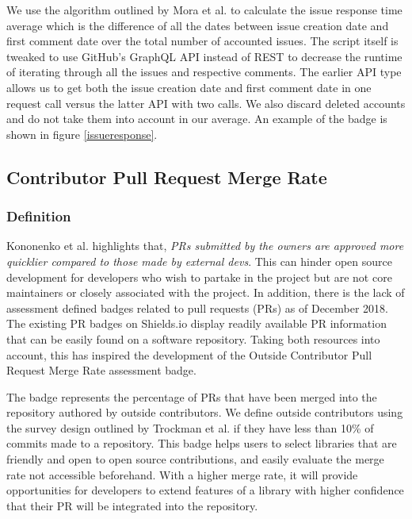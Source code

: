 \documentclass[12pt, letterpaper]{article}
\begin{document}
We use the algorithm outlined by Mora et al. \cite{metrics} to calculate the issue response time average which
is the difference of all the dates between issue creation date and first comment date over the total number of 
accounted issues. 
The script itself is tweaked to use GitHub's \cite{github} GraphQL API instead of REST to decrease the runtime of iterating through
all the issues and respective comments. The earlier API type allows us to get both the issue creation date and first
comment date in one request call versus the latter API with two calls.
We also discard deleted accounts and do not take them into account in our average.
An example of the badge is shown in figure \ref{issueresponse}.


\subsection{Contributor Pull Request Merge Rate}
\subsubsection{Definition}
Kononenko et al. \cite{shopifyarticle} highlights that, \textit{PRs submitted by the owners are approved more
quicklier compared to those made by external devs}. This can hinder open source development
for developers who wish to partake in the project but are not core maintainers or closely associated with the project.
In addition, there is the lack of assessment defined badges \cite{githubbadges} related to pull requests (PRs)
as of December 2018.
The existing PR badges on Shields.io \cite{shields} display readily available PR information that can be easily found on a 
software repository. Taking both resources \cite{shields, shopifyarticle} into account, this has inspired
the development of the Outside Contributor Pull Request Merge Rate assessment badge. 


The badge represents the percentage of PRs that have been merged into the repository authored by outside contributors.
We define outside contributors using the survey design outlined by Trockman et al. \cite{githubbadges} if they have 
less than 10\% of commits made to a repository. 
This badge helps users to select libraries that are friendly and open to open source contributions,
and easily evaluate the merge rate not accessible beforehand.
With a higher merge rate, it will provide opportunities for developers to extend features of a library with 
higher confidence that their PR will be integrated into the repository.
\end{document}
